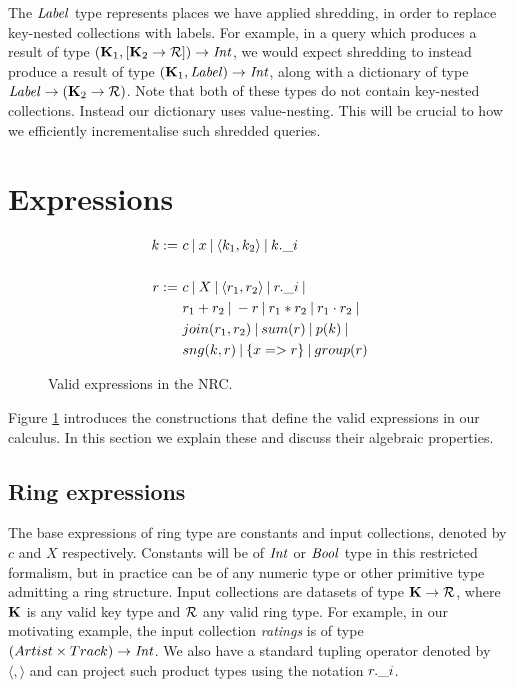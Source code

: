 {{{The $\textrm{\textit{Label}}$ type represents places we have applied shredding, in order to replace key-nested collections with labels. For example, in a query which produces a result of type  $(\mathbf{K}_1,[\mathbf{K}_2 \rightarrow \mathcal{R}]) \rightarrow \textrm{\textit{Int}}$, we would expect shredding to instead produce a result of type 
$(\mathbf{K}_1,\textrm{\textit{Label}}) \rightarrow \textrm{\textit{Int}}$, along with a dictionary of type $\textrm{\textit{Label}} \rightarrow (\mathbf{K}_2 \rightarrow \mathcal{R})$. Note that both of these types do not contain key-nested collections. Instead our dictionary uses value-nesting. This will be crucial to how we efficiently incrementalise such shredded queries.

}

\section{Expressions}

\begin{figure}
\begin{equation*}
\begin{split}
k := \ & c \: | \: x \: | \: \langle k_1, k_2 \rangle \: | \: k.\_i \\ \\
r := \ & c \: | \: X \: | \: \langle r_1, r_2 \rangle \: | \: r.\_i \: | \: \\
& r_1 + r_2 \: | \: -r \: | \: r_1 \ast r_2 \: | \: r_1 \cdot r_2 \: | \: \\
& join(r_1,r_2) \: | \: sum(r) \: | \: p(k) \: | \: \\
& sng(k,r) \: | \: \{ x => r \} \: | \: group(r)
\end{split}
\end{equation*}
\caption{Valid expressions in the NRC.}
\label{nrcexprs}
\end{figure}

Figure \ref{nrcexprs} introduces the constructions that define the valid expressions in our calculus. In this section we explain these and discuss their algebraic properties.

\subsection{Ring expressions} {
The base expressions of ring type are constants and input collections, denoted by $c$ and $X$ respectively. Constants will be of $\textrm{\textit{Int}}$ or $\textrm{\textit{Bool}}$ type in this restricted formalism, but in practice can be of any numeric type or other primitive type admitting a ring structure. Input collections are datasets of type $\mathbf{K} \rightarrow \mathcal{R}$, where $\mathbf{K}$ is any valid key type and $\mathcal{R}$ any valid ring type. For example, in our motivating example, the input collection \textit{ratings} is of type $(Artist \times Track) \rightarrow \textrm{\textit{Int}}$. We also have a standard tupling operator denoted by $\langle , \rangle$ and can project such product types using the notation $r.\_i$.

}}}
